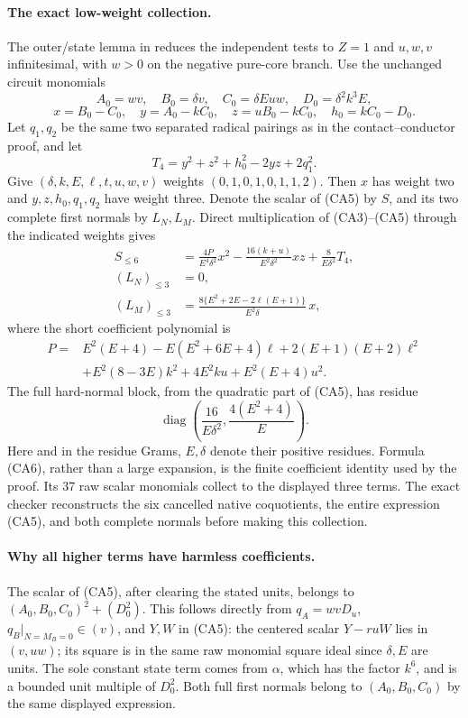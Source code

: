 \paragraph{The exact low-weight collection.}
The outer/state lemma in  reduces the
independent tests to $Z=1$ and $u,w,v$ infinitesimal, with $w>0$ on
the negative pure-core branch. Use the unchanged circuit monomials
\[
 A_0=wv,\quad B_0=\delta v,\quad C_0=\delta Euw,
 \quad D_0=\delta^2k^3E,
\]
\[
 x=B_0-C_0,\quad y=A_0-kC_0,\quad
 z=uB_0-kC_0,\quad h_0=kC_0-D_0.
\]
Let $q_1,q_2$ be the same two separated radical pairings as in the
contact--conductor proof, and let
\[
 T_4=y^2+z^2+h_0^2-2yz+2q_1^2.
\]
Give $(\delta,k,E,\ell,t,u,w,v)$ weights $(0,1,0,1,0,1,1,2)$.
Then $x$ has weight two and $y,z,h_0,q_1,q_2$ have weight three.
Denote the scalar of (CA5) by $S$, and its two complete first normals
by $L_N,L_M$. Direct multiplication of (CA3)--(CA5) through the
indicated weights gives
\[
 \begin{aligned}
 S_{\le6}&=\frac{4P}{E^4\delta^2}x^2
 -\frac{16(k+u)}{E^2\delta^2}xz
 +\frac8{E\delta^2}T_4,\\
 (L_N)_{\le3}&=0,\\
 (L_M)_{\le3}&=
 \frac{8\{E^2+2E-2\ell(E+1)\}}{E^2\delta}\,x,
 \end{aligned}                                                   \tag{CA6}
\]
where the short coefficient polynomial is
\[
 \begin{split}
 P={}&E^2(E+4)-E(E^2+6E+4)\ell+2(E+1)(E+2)\ell^2\\
 &+E^2(8-3E)k^2+4E^2ku+E^2(E+4)u^2.
 \end{split}
\]
The full hard-normal block, from the quadratic part of (CA5), has
residue
\[
       \operatorname{diag}\left(\frac{16}{E\delta^2},
                                \frac{4(E^2+4)}E\right).          \tag{CA7}
\]
Here and in the residue Grams, $E,\delta$ denote their positive
residues. Formula (CA6), rather than a large expansion, is the finite
coefficient identity used by the proof. Its 37 raw scalar monomials
collect to the displayed three terms. The exact checker reconstructs
the six cancelled native coquotients, the entire expression (CA5),
and both complete normals before making this collection.

\paragraph{Why all higher terms have harmless coefficients.}
The scalar of (CA5), after clearing the stated units, belongs to
$(A_0,B_0,C_0)^2+(D_0^2)$. This follows directly from $q_A=wvD_u$,
$q_B|_{N=M_B=0}\in(v)$, and $Y,W$ in (CA5): the centered scalar
$Y-r uW$ lies in $(v,uw)$; its square is in the same raw monomial
square ideal since $\delta,E$ are units. The sole constant state term
comes from $\alpha$, which has the factor $k^6$, and is a bounded
unit multiple of $D_0^2$. Both full first normals belong to
$(A_0,B_0,C_0)$ by the same displayed expression.

